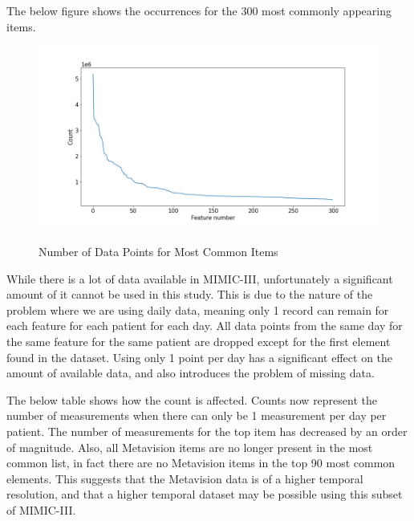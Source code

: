 \documentclass[12pt]{article}
\begin{document}
The below figure shows the occurrences for the 300 most commonly appearing items. 
\begin{figure}[H]
\centering\caption{Number of Data Points for Most Common Items}
\includegraphics[scale=0.45]{Number of Data Points for Most Common Items.png}
\label{Number of Data Points for Most Common Items)}
\end{figure}

While there is a lot of data available in MIMIC-III, unfortunately a significant amount of it cannot be used in this study. This is due to the nature of the problem where we are using daily data, meaning only 1 record can remain for each feature for each patient for each day.  All data points from the same day for the same feature for the same patient are dropped except for the first element found in the dataset. Using only 1 point per day has a significant effect on the amount of available data, and also introduces the problem of missing data.

The below table shows how the count is affected. Counts now represent the number of measurements when there can only be 1 measurement per day per patient. The number of measurements for the top item has decreased by an order of magnitude. Also, all Metavision items are no longer present in the most common list, in fact there are no Metavision items in the top 90 most common elements. This suggests that the Metavision data is of a higher temporal resolution, and that a higher temporal dataset may be possible using this subset of MIMIC-III.
\end{document}
